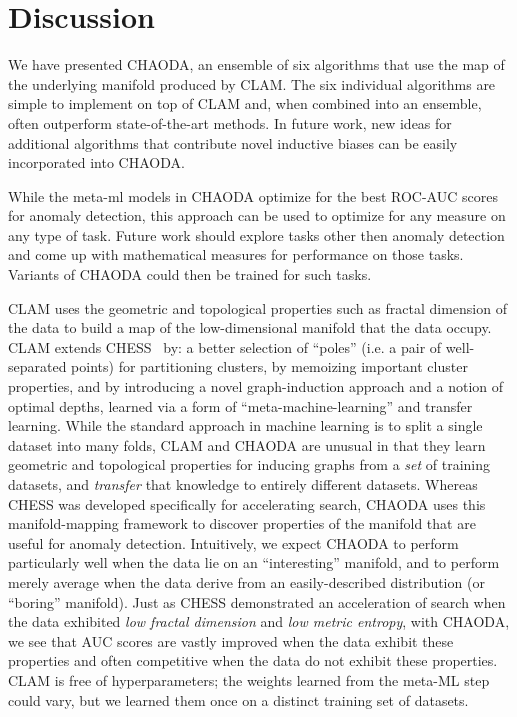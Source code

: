 \section{Discussion}
\label{sec:discussion}

We have presented CHAODA, an ensemble of six algorithms that use the map of the underlying manifold produced by CLAM\@.
The six individual algorithms are simple to implement on top of CLAM and, when combined into an ensemble, often outperform state-of-the-art methods.
In future work, new ideas for additional algorithms that contribute novel inductive biases can be easily incorporated into CHAODA.

While the meta-ml models in CHAODA optimize for the best ROC-AUC scores for anomaly detection, this approach can be used to optimize for any measure on any type of task.
Future work should explore tasks other then anomaly detection and come up with mathematical measures for performance on those tasks.
Variants of CHAODA could then be trained for such tasks.

CLAM uses the geometric and topological properties such as fractal dimension of the data to build a map of the low-dimensional manifold that the data occupy.
CLAM extends CHESS~\cite{ishaq2019clustered} by:
a better selection of ``poles'' (i.e. a pair of well-separated points) for partitioning clusters,
by memoizing important cluster properties, and
by introducing a novel graph-induction approach and a notion of optimal depths, learned via a form of ``meta-machine-learning'' and transfer learning.
While the standard approach in machine learning is to split a single dataset into many folds, CLAM and CHAODA are unusual in that they learn geometric and topological properties for inducing graphs from a \emph{set} of training datasets, and \emph{transfer} that knowledge to entirely different datasets.
Whereas CHESS was developed specifically for accelerating search,
CHAODA uses this manifold-mapping framework to discover properties of the manifold that are useful for anomaly detection.
Intuitively, we expect CHAODA to perform particularly well when the data lie on an ``interesting'' manifold, and to perform merely average when the data derive from an easily-described distribution (or ``boring'' manifold).
Just as CHESS demonstrated an acceleration of search when the data exhibited \emph{low fractal dimension} and \emph{low metric entropy}, with CHAODA, we see that AUC scores are vastly improved when the data exhibit these properties and often competitive when the data do not exhibit these properties.
CLAM is free of hyperparameters; the weights learned from the meta-ML step could vary, but we learned them once on a distinct training set of datasets.

